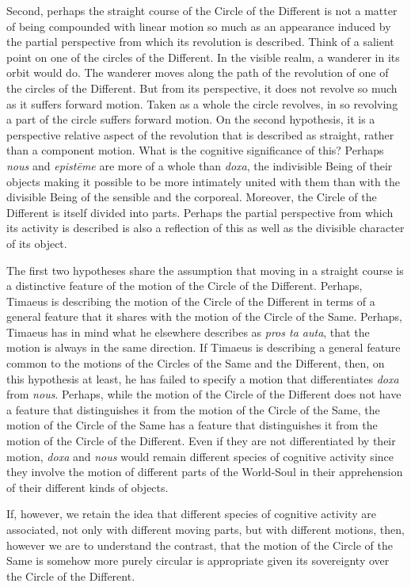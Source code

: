 Second, perhaps the straight course of the Circle of the Different is not a matter of being compounded with linear motion so much as an appearance induced by the partial perspective from which its revolution is described. Think of a salient point on one of the circles of the Different. In the visible realm, a wanderer in its orbit would do. The wanderer moves along the path of the revolution of one of the circles of the Different. But from its perspective, it does not revolve so much as it suffers forward motion.  Taken as a whole the circle revolves, in so revolving a part of the circle suffers forward motion. On the second hypothesis, it is a perspective relative aspect of the revolution that is described as straight, rather than a component motion. What is the cognitive significance of this? Perhaps \emph{nous} and \emph{epistēme} are more of a whole than \emph{doxa}, the indivisible Being of their objects making it possible to be more intimately united with them than with the divisible Being of the sensible and the corporeal. Moreover, the Circle of the Different is itself divided into parts. Perhaps the partial perspective from which its activity is described is also a reflection of this as well as the divisible character of its object.

The first two hypotheses share the assumption that moving in a straight course is a distinctive feature of the motion of the Circle of the Different. Perhaps, Timaeus is describing the motion of the Circle of the Different in terms of a general feature that it shares with the motion of the Circle of the Same. Perhaps, Timaeus has in mind what he elsewhere describes as \emph{pros ta auta}, that the motion is always in the same direction. If Timaeus is describing a general feature common to the motions of the Circles of the Same and the Different, then, on this hypothesis at least, he has failed to specify a motion that differentiates \emph{doxa} from \emph{nous}. Perhaps, while the motion of the Circle of the Different does not have a feature that distinguishes it from the motion of the Circle of the Same, the motion of the Circle of the Same has a feature that distinguishes it from the motion of the Circle of the Different. Even if they are not differentiated by their motion, \emph{doxa} and \emph{nous} would remain different species of cognitive activity since they involve the motion of different parts of the World-Soul in their apprehension of their different kinds of objects.

If, however, we retain the idea that different species of cognitive activity are associated, not only with different moving parts, but with different motions, then, however we are to understand the contrast, that the motion of the Circle of the Same is somehow more purely circular is appropriate given its sovereignty over the Circle of the Different.


